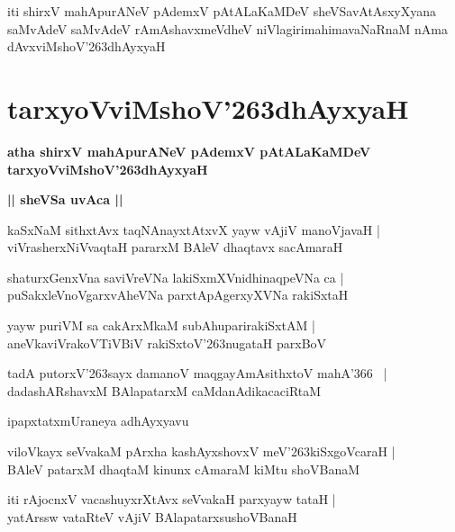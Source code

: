\documentclass[twoside,12pt,openright]{book}
\def\S{\char'263}
\newcounter{shloka}[chapter]
\def\uvaca#1{\centerline{{\large\textbf{#1}}}}
\begin{document}
\begin{center}
iti shirxV mahApurANeV pAdemxV pAtALaKaMDeV sheVSavAtAsxyXyana saMvAdeV 
saMvAdeV rAmAshavxmeVdheV niVlagirimahimavaNaRnaM nAma dAvxviMshoV\S dhAyxyaH
\end{center}

\chapter{tarxyoVviMshoV\S dhAyxyaH}

\begin{center}
{\LARGE\bfseries atha shirxV mahApurANeV pAdemxV pAtALaKaMDeV tarxyoVviMshoV\S dhAyxyaH}
\end{center}

\uvaca{|| sheVSa uvAca ||}

\begin{shloka}%
kaSxNaM sithxtAvx taqNAnayxtAtxvX yayw vAjiV manoVjavaH |\\
viVrasherxNiVvaqtaH pararxM BAleV dhaqtavx sacAmaraH 
\end{shloka}

\begin{shloka}%
shaturxGenxVna saviVreVNa lakiSxmXVnidhinaqpeVNa ca |\\
puSakxleVnoVgarxvAheVNa parxtApAgerxyXVNa rakiSxtaH 
\end{shloka}

\begin{shloka}%
yayw puriVM sa cakArxMkaM subAhuparirakiSxtAM |\\
aneVkaviVrakoVTiVBiV rakiSxtoV\S nugataH parxBoV 
\end{shloka}

\begin{shloka}%
tadA putorxV\S sayx damanoV maqgayAmAsithxtoV mahA\char'366 ~|\\
dadashARshavxM BAlapatarxM caMdanAdikacaciRtaM 
\end{shloka}

\begin{center}
ipapxtatxmUraneya adhAyxyavu
\end{center}

\begin{shloka}%
viloVkayx seVvakaM pArxha kashAyxshovxV meV\S kiSxgoVcaraH |\\
BAleV patarxM dhaqtaM kinunx cAmaraM kiMtu shoVBanaM 
\end{shloka}

\begin{shloka}%
iti rAjocnxV vacashuyxrXtAvx seVvakaH parxyayw tataH |\\
yatArssw vataRteV vAjiV BAlapatarxsushoVBanaH 
\end{shloka}
\end{document}
